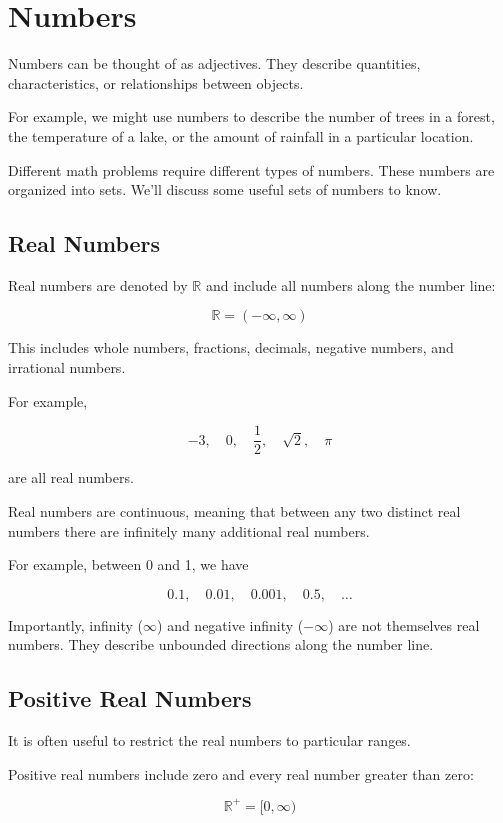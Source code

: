 \documentclass[12pt]{article}
\begin{document}
\section{Numbers}

Numbers can be thought of as adjectives. They describe quantities, characteristics, or relationships between objects.

For example, we might use numbers to describe the number of trees in a forest, the temperature of a lake, or the amount of rainfall in a particular location.

Different math problems require different types of numbers. These numbers are organized into sets. We'll discuss some useful sets of numbers to know.

\subsection{Real Numbers}

Real numbers are denoted by $\mathbb{R}$ and include all numbers along the number line:

\[
\mathbb{R}=(-\infty,\infty)
\]

This includes whole numbers, fractions, decimals, negative numbers, and irrational numbers.

For example,

\[
-3,\quad 0,\quad \frac{1}{2},\quad \sqrt{2},\quad \pi
\]

are all real numbers.

Real numbers are continuous, meaning that between any two distinct real numbers there are infinitely many additional real numbers.

For example, between 0 and 1, we have

\[
0.1,\quad 0.01,\quad 0.001,\quad 0.5,\quad \ldots
\]

Importantly, infinity ($\infty$) and negative infinity ($-\infty$) are not themselves real numbers. They describe unbounded directions along the number line.

\subsection{Positive Real Numbers}

It is often useful to restrict the real numbers to particular ranges.

Positive real numbers include zero and every real number greater than zero:

\[
\mathbb{R}^+=[0,\infty)
\]
\end{document}
